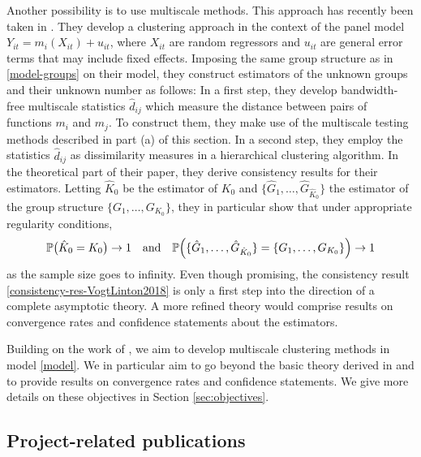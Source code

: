 \documentclass[a4paper,12pt]{article}
\begin{document}
Another possibility is to use multiscale methods. This approach has recently been taken in \cite{VogtLinton2018}. They develop a clustering approach in the context of the panel model $Y_{it} = m_i(X_{it}) + u_{it}$, where $X_{it}$ are random regressors and $u_{it}$ are general error terms that may include fixed effects. Imposing the same group structure as in \eqref{model-groups} on their  model, they construct estimators of the unknown groups and their unknown number as follows: In a first step, they develop bandwidth-free multiscale statistics $\hat{d}_{ij}$ which measure the distance between pairs of functions $m_i$ and $m_j$. To construct them, they make use of the multiscale testing methods described in part (a) of this section. In a second step, they employ the statistics $\hat{d}_{ij}$ as dissimilarity measures in a hierarchical clustering algorithm. In the theoretical part of their paper, they derive consistency results for their estimators. Letting $\hat{K}_0$ be the estimator of $K_0$ and $\{ \hat{G}_1,\ldots,\hat{G}_{\hat{K}_0} \}$ the estimator of the group structure $\{ G_1,\ldots,G_{K_0} \}$, they in particular show that under appropriate regularity conditions, 
\begin{equation}\label{consistency-res-VogtLinton2018}
\mathbb{P} \big( \hat{K}_0 = K_0 \big) \rightarrow 1 \quad \text{and} \quad \mathbb{P} \Big( \{ \hat{G}_1,\ldots,\hat{G}_{\hat{K}_0} \} = \{ G_1,\ldots,G_{K_0} \} \Big) \rightarrow 1 
\end{equation}
as the sample size goes to infinity. %
Even though promising, the consistency result \eqref{consistency-res-VogtLinton2018} is only a first step into the direction of a complete asymptotic theory. A more refined theory would comprise results on convergence rates and confidence statements about the estimators. 


Building on the work of \cite{VogtLinton2018}, we aim to develop multiscale clustering methods in model \eqref{model}. We in particular aim to go beyond the basic theory derived in \cite{VogtLinton2018} and to provide results on convergence rates and confidence statements. We give more details on these objectives in Section \ref{sec:objectives}.  


\subsection{Project-related publications}
\end{document}
